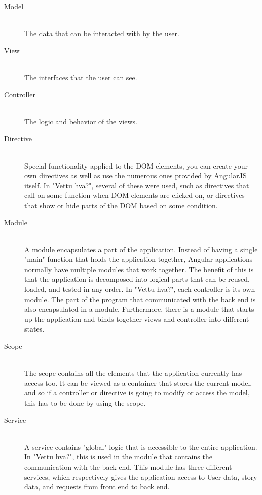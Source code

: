 \begin{description}
	\item[Model] \hfill \\ 
	The data that can be interacted with by the user.
	
	\item[View] \hfill \\ 
	The interfaces that the user can see.
	
	\item[Controller] \hfill \\ 
	The logic and behavior of the views.
	
	\item[Directive] \hfill \\ 
	Special functionality applied to the DOM elements, you can create your own directives as well as use the numerous ones provided by AngularJS itself. In "Vettu hva?", several of these were used, such as directives that call on some function when DOM elements are clicked on, or directives that show or hide parts of the DOM based on some condition.
	
	\item[Module] \hfill \\ 
	A module encapsulates a part of the application. Instead of having a single "main" function that holds the application together, Angular applications normally have multiple modules that work together. The benefit of this is that the application is decomposed into logical parts that can be reused, loaded, and tested in any order. In "Vettu hva?", each controller is its own module. The part of the program that communicated with the back end is also encapsulated in a module. Furthermore, there is a module that starts up the application and binds together views and controller into different states.
	
	\item[Scope] \hfill \\ 
	The scope contains all the elements that the application currently has access too. It can be viewed as a container that stores the current model, and so if a controller or directive is going to modify or access the model, this has to be done by using the scope.
	
	\item[Service] \hfill \\ 
	A service contains "global" logic that is accessible to the entire application. In "Vettu hva?", this is used in the module that contains the communication with the back end. This module has three different services, which respectively gives the application access to User data, story data, and requests from front end to back end.
\end{description}

